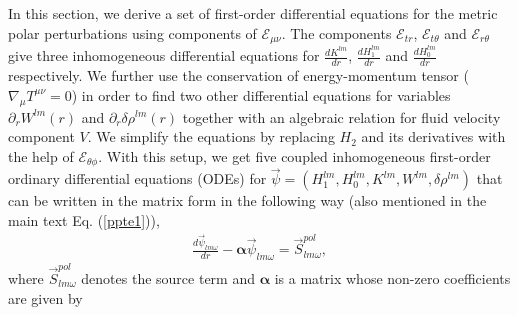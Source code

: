 \documentclass[11pt]{article}
\begin{document}
In this section, we derive a set of first-order differential equations for the metric polar perturbations using components of $\mathcal{E}_{\mu\nu}$. The components $\mathcal{E}_{tr}$, $\mathcal{E}_{t\theta}$ and $\mathcal{E}_{r\theta}$ give three inhomogeneous differential equations for $\frac{dK^{lm}}{dr}$, $\frac{dH_{1}^{lm}}{dr}$ and $\frac{dH_{0}^{lm}}{dr}$ respectively. We further use the conservation of energy-momentum tensor ($\nabla_{\mu}T^{\mu\nu}=0$) in order to find two other differential equations for variables $\partial_{r}W^{lm}(r)$ and $\partial_{r}\delta\rho^{lm}(r)$ together with an algebraic relation for fluid velocity component $V$. We simplify the equations by replacing $H_{2}$ and its derivatives with the help of $\mathcal{E}_{\theta\phi}$. With this setup, we get five coupled inhomogeneous first-order ordinary differential equations (ODEs) for $\vec{\psi}=(H^{lm}_1, H^{lm}_0, K^{lm}, W^{lm},\delta\rho^{lm})$ that can be written in the matrix form in the following way (also mentioned in the main text Eq. (\ref{ppte1})),
\begin{align}
  \frac{d\vec{\psi}_{lm\omega}}{dr}-\boldsymbol{\alpha}\vec{\psi}_{lm\omega}=\vec S^{pol}_{lm\omega} ,
\end{align}
where $\vec S^{pol}_{lm\omega}$ denotes the source term and $\boldsymbol{\alpha}$ is a matrix whose non-zero coefficients are given by
\end{document}

